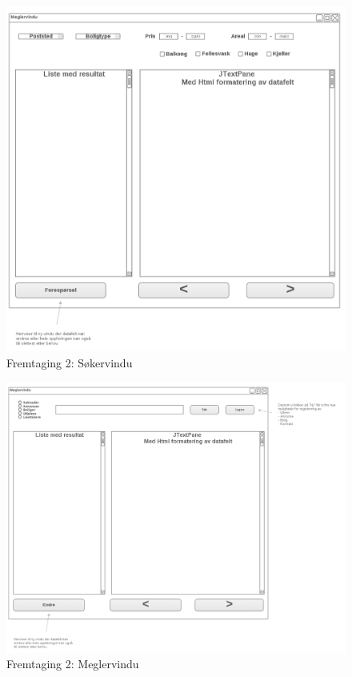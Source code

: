 \begin{figure}[ht]
 \includegraphics[width=\textwidth,height=\textheight,keepaspectratio]{./img/appendix/gui_forslag/rev_2/Sokervindu.png}
 \caption{Fremtaging 2: Søkervindu}
 \label{fig:DEV:Sokervindu}
\end{figure}

\begin{figure}[ht]
 \includegraphics[width=\textwidth,height=\textheight,keepaspectratio]{./img/appendix/gui_forslag/rev_2/Meglervindu.png}
 \caption{Fremtaging 2: Meglervindu}
 \label{fig:DEV:Meglervindu}
\end{figure}